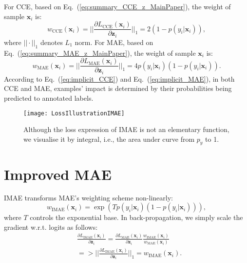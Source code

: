 \documentclass{article}
\begin{document}
For CCE, based on Eq.~(\ref{eq:summary_CCE_z_MainPaper}), the weight of sample $\mathbf{x}_{i}$ is:
\begin{equation}
	\label{eq:implicit_CCE}
	w_\mathrm{CCE}(\mathbf{x}_{i}) = ||\frac{\partial L_{\mathrm{CCE}}(\mathbf{x}_i)}{\partial \mathbf{z}_{i}}||_1 = 2
(1-p(y_i|\mathbf{x}_i)),
\end{equation}
where $||\cdot||_1$ denotes $L_1$ norm. 
For MAE, based on Eq.~(\ref{eq:summary_MAE_z_MainPaper}), the weight of sample $\mathbf{x}_{i}$ is:
\begin{equation}
	\label{eq:implicit_MAE}
	w_\mathrm{MAE} (\mathbf{x}_{i}) = ||\frac{\partial L_{\mathrm{MAE}}(\mathbf{x}_i)}{\partial \mathbf{z}_{i}}||_1 = 4
p(y_i|\mathbf{x}_i) 
(1-p(y_i|\mathbf{x}_i)).
\end{equation}
According to Eq.~(\ref{eq:implicit_CCE}) and Eq.~(\ref{eq:implicit_MAE}), in both CCE and MAE, examples' impact is determined by their probabilities being predicted to annotated labels. 




\begin{figure}[!t]
	\centering
	\vspace{-0.6cm}
	\texttt{[image: LossIllustrationIMAE]}
	\vspace{-0.1cm}
	\caption{
		Although the loss expression of IMAE is not an elementary function, we visualise it by integral, i.e., the area under curve from $p_y$ to 1.   
	}
	\label{fig:loss_visualisation_IMAE}
	\vspace{-0.2cm}
\end{figure}




\section{Improved MAE}
\label{sec:improved_MAE}

IMAE transforms MAE's weighting scheme non-linearly:
\begin{equation}
	w_\mathrm{IMAE} (\mathbf{x}_{i}) =  \exp(T   
p(y_i|\mathbf{x}_i) 
(1-p(y_i|\mathbf{x}_i))),
	\label{eq:weight_IMAE}
\end{equation}
where $T$ controls the exponential base. 
In back-propagation, we simply scale the gradient w.r.t. logits as follows: 
\begin{equation}
	\label{eq:implicit_IMAE}
	\begin{aligned}
		&\frac{\partial L_{\mathrm{IMAE}}(\mathbf{x}_i)}{\partial \mathbf{z}_{i}} = \frac{\partial L_{\mathrm{MAE}}(\mathbf{x}_i)}{\partial \mathbf{z}_{i}}  \frac{w_\mathrm{IMAE} (\mathbf{x}_{i})}{w_\mathrm{MAE} (\mathbf{x}_{i})}\\
		&=> ||\frac{\partial L_{\mathrm{IMAE}}(\mathbf{x}_i)}{\partial \mathbf{z}_{i}}||_1 = w_\mathrm{IMAE} (\mathbf{x}_{i}).
	\end{aligned}
\end{equation}
\end{document}
